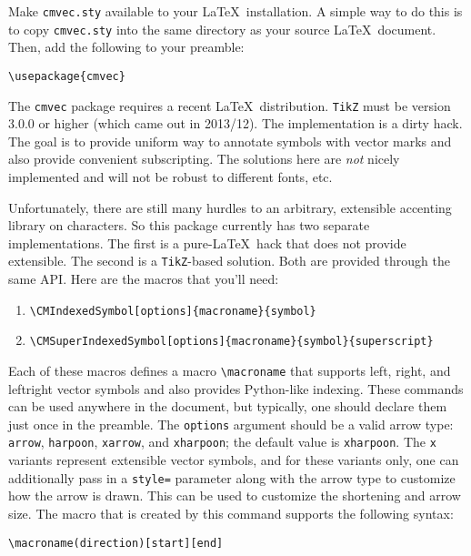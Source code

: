 \documentclass{article}
\begin{document}
\setlength{\parindent}{0pt}

Make \verb+cmvec.sty+ available to your \LaTeX\
installation. A simple way to do this is to copy \verb+cmvec.sty+ into
the same directory as your source \LaTeX\ document. Then, add the following
to your preamble:
\begin{center}
\verb+\usepackage{cmvec}+
\end{center}

The \verb+cmvec+ package requires a recent \LaTeX\ distribution. \verb+TikZ+
must be version 3.0.0 or higher (which came out in 2013/12). The implementation
is a dirty hack. The goal is to provide uniform way to annotate symbols with
vector marks and also provide convenient subscripting. The solutions here are
\emph{not} nicely implemented and will not be robust to different fonts, etc.

Unfortunately, there are still many hurdles to an arbitrary, extensible
accenting library on characters. So this package currently has two separate
implementations. The first is a pure-\LaTeX\ hack that does not provide
extensible. The second is a \verb+TikZ+-based solution. Both are provided
through the same API. Here are the macros that you'll need:

\begin{enumerate}
  \item \verb+\CMIndexedSymbol[options]{macroname}{symbol}+
  \item \verb+\CMSuperIndexedSymbol[options]{macroname}{symbol}{superscript}+
\end{enumerate}

Each of these macros defines a macro \verb+\macroname+ that supports
left, right, and leftright vector symbols and also provides Python-like
indexing.  These commands can be used anywhere in the document, but typically,
one should declare them just once in the preamble. The \verb+options+ argument
should be a valid arrow type:
\verb+arrow+, \verb+harpoon+, \verb+xarrow+, and \verb+xharpoon+; the default
value is \verb+xharpoon+. The \verb+x+ variants represent extensible vector
symbols, and for these variants only, one can additionally pass in a \verb+style=+
parameter along with the arrow type to customize how the arrow is drawn. This
can be used to customize the shortening and arrow size. The macro that is
created by this command supports
the following syntax:

\begin{center}
\verb+\macroname(direction)[start][end]+
\end{center}
\end{document}
